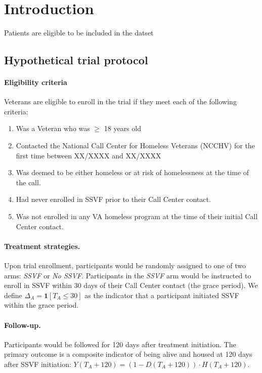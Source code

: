 \section{Introduction}
Patients are eligible to be included in the datset

\subsection{Hypothetical trial protocol}
\paragraph{Eligibility criteria} Veterans are eligible to enroll in the trial if they meet each of the following criteria:
\begin{enumerate}
    \item Was a Veteran who was $\geq$ 18 years old
    \item Contacted the National Call Center for Homeless Veterans (NCCHV) for the first time between XX/XXXX and XX/XXXX
    \item Was deemed to be either homeless or at risk of homelessness at the time of the call.
    \item Had never enrolled in SSVF prior to their Call Center contact.
    \item Was not enrolled in any VA homeless program at the time of their initial Call Center contact.
\end{enumerate}

\paragraph{Treatment strategies.} Upon trial enrollment, participants would be randomly assigned to one of two arms: \textit{SSVF} or \textit{No SSVF}. Participants in the \textit{SSVF} arm would be instructed to enroll in SSVF within 30 days of their Call Center contact (the grace period). We define $\Delta_A = \mathbf{1}[T_A \leq 30]$ as the indicator that a participant initiated SSVF within the grace period.

\paragraph{Follow-up.} Participants would be followed for 120 days after treatment initiation. The primary outcome is a composite indicator of being alive and housed at 120 days after SSVF initiation: $Y(T_A + 120) = (1 - D(T_A + 120)) \cdot H(T_A + 120)$.
